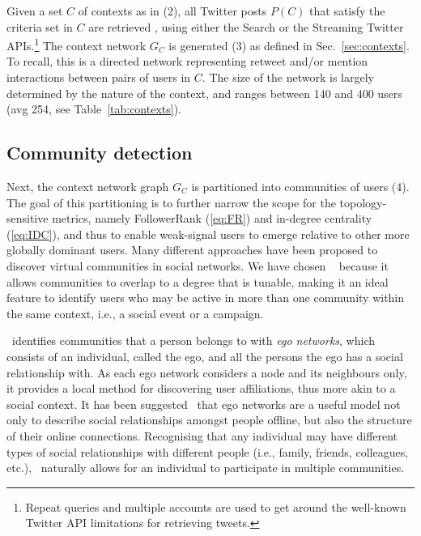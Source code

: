  
Given a set $C$ of contexts as in (2), all Twitter posts $P(C)$ that satisfy the criteria set in $C$ are retrieved , using either the Search or the Streaming  Twitter APIs.\footnote{Repeat queries and multiple accounts are used to get around the well-known Twitter API limitations for retrieving tweets.}
%
The context network $G_C$ is generated (3) as defined in Sec.~\ref{sec:contexts}. To recall, this is a directed network representing retweet and/or mention interactions between pairs of users in $C$. 
The size of the network is largely determined by the nature of the context, and  ranges between 140 and 400 users (avg 254, see Table~\ref{tab:contexts}).

\subsection{Community detection} \label{sec:communities}

Next, the context network graph $G_C$  is partitioned into communities of users (4).
The goal of this partitioning is to further narrow the scope for the topology-sensitive metrics, namely FollowerRank (\ref{eq:FR})  and in-degree centrality (\ref{eq:IDC}), 
and thus to enable weak-signal users to emerge relative to other more globally dominant users.
%
Many different approaches have been proposed to discover virtual communities in social networks. 
We have chosen \demon~\cite{Coscia:2012:DLD:2339530.2339630}  because it allows communities to overlap to a degree that is tunable, making it an ideal feature to identify users who may be active in more than one community within the same context, i.e., a social event or a campaign.

\demon~identifies communities that a person belongs to with \textit{ego networks}, which consists of an individual, called the ego, and all the persons the ego has a social relationship with. 
As each ego network considers a node and its neighbours only, it provides a local method for discovering user affiliations, thus more akin to a social context.
%
It has been suggested~\cite{Arnaboldi2013} that ego networks are a useful model not only to describe social relationships amongst people offline, but also the structure of their online connections. 
Recognising that any individual may have different types of social relationships with different people (i.e., family, friends, colleagues, etc.), \demon~naturally allows for an individual to participate in multiple communities. 


